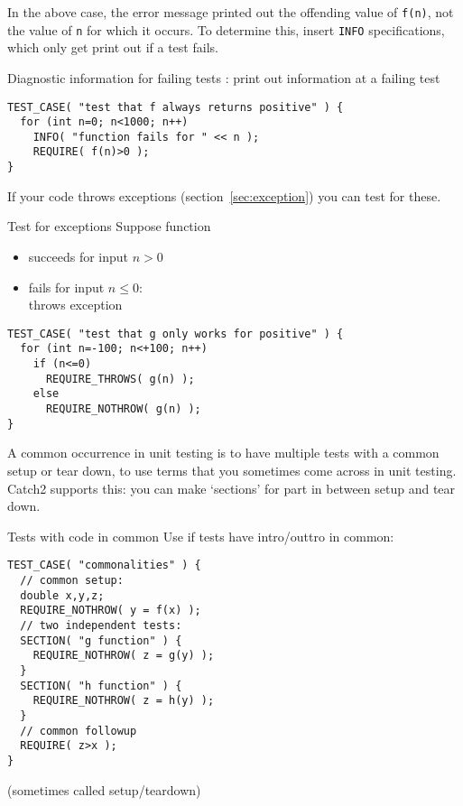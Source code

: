 In the above case, the error message
printed out the offending value of \lstinline+f(n)+,
not the value of \lstinline+n+ for which it occurs.
To determine this, insert \lstinline+INFO+ specifications,
which only get print out if a test fails.

\begin{block}{Diagnostic information for failing tests}
  \label{sl:catch-info}
  : print out information at a failing test
\begin{lstlisting}
TEST_CASE( "test that f always returns positive" ) {
  for (int n=0; n<1000; n++)
    INFO( "function fails for " << n );
    REQUIRE( f(n)>0 );  
}  
\end{lstlisting}
\end{block}

If your code throws exceptions (section~\ref{sec:exception})
you can test for these.

\begin{block}{Test for exceptions}
  \label{sl:catch-case-throw}
Suppose function 
\begin{itemize}
\item succeeds for input $n>0$
\item fails for input $n\leq 0$:\\ throws exception
\end{itemize}

\begin{lstlisting}
TEST_CASE( "test that g only works for positive" ) {
  for (int n=-100; n<+100; n++)
    if (n<=0)
      REQUIRE_THROWS( g(n) );  
    else
      REQUIRE_NOTHROW( g(n) );  
}
\end{lstlisting}
\end{block}

A common occurrence in unit testing is to have
multiple tests with a common setup or tear down,
to use terms that you sometimes come across in unit testing.
Catch2 supports this:
you can make `sections' for part in between setup and tear down.

\begin{block}{Tests with code in common}
\label{sl:catch-section}
Use  if tests have intro/outtro in common:
\begin{lstlisting}
TEST_CASE( "commonalities" ) {
  // common setup:
  double x,y,z;
  REQUIRE_NOTHROW( y = f(x) );
  // two independent tests:
  SECTION( "g function" ) {
    REQUIRE_NOTHROW( z = g(y) );
  }
  SECTION( "h function" ) {
    REQUIRE_NOTHROW( z = h(y) );
  }
  // common followup
  REQUIRE( z>x );
}
\end{lstlisting}
(sometimes called setup/teardown)
\end{block}

